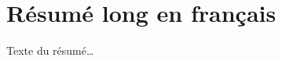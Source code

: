
\graphicspath{{./}{./fig/}{./appendices/fig/}}



\chapter{Résumé long en français}

\begin{otherlanguage}{french}

Texte du résumé\ldots

\end{otherlanguage}